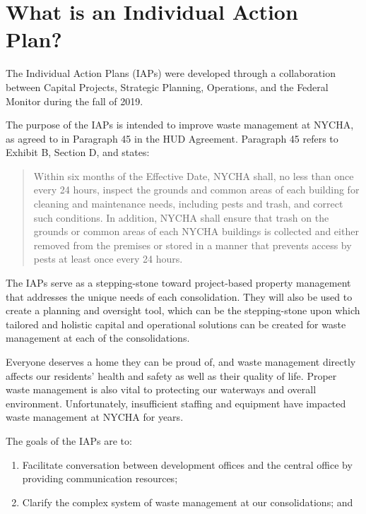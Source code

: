     {\selectfont
    \section{What is an Individual Action Plan?}

The Individual Action Plans (IAPs) were developed through a collaboration between Capital Projects, Strategic Planning, Operations, and the Federal Monitor during the fall of 2019. 

The purpose of the IAPs is intended to improve waste management at NYCHA, as agreed to in Paragraph 45 in the HUD Agreement. Paragraph 45 refers to Exhibit B, Section D, and states:

\begin{quote}

Within six months of the Effective Date, NYCHA shall, no less than once every 24 hours, inspect the grounds and common areas of each building for cleaning and maintenance needs, including pests and trash, and correct such conditions. In addition, NYCHA shall ensure that trash on the grounds or common areas of each NYCHA buildings is collected and either removed from the premises or stored in a manner that prevents access by pests at least once every 24 hours.

\end{quote}

The  IAPs serve as a stepping-stone toward project-based property management that addresses the unique needs of each consolidation. They will also be used to create a planning and oversight tool, which can be the stepping-stone upon which tailored and holistic capital and operational solutions can be created for waste management at each of the consolidations.

Everyone deserves a home they can be proud of, and waste management directly affects our residents' health and safety as well as their quality of life. Proper waste management is also vital to protecting our waterways and overall environment. Unfortunately, insufficient staffing and equipment have impacted waste management at NYCHA for years. 

The goals of the IAPs are to: 

\begin{enumerate}[noitemsep]

\item Facilitate conversation between development offices and the central office by providing communication resources;

\item Clarify the complex system of waste management at our consolidations; and


\end{enumerate}}
